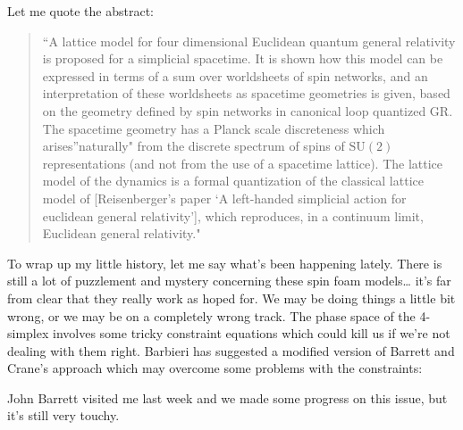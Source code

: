 \documentclass{article}
\def\tightlist{}
\renewcommand{\texttt}[1]{%
  \begingroup
  \ttfamily
  \begingroup\lccode`~=`/\lowercase{\endgroup\def~}{/\discretionary{}{}{}}%
  \begingroup\lccode`~=`[\lowercase{\endgroup\def~}{[\discretionary{}{}{}}%
  \begingroup\lccode`~=`.\lowercase{\endgroup\def~}{.\discretionary{}{}{}}%
  \catcode`/=\active\catcode`[=\active\catcode`.=\active
  \scantokens{#1\noexpand}%
  \endgroup
}
\begin{document}

Let me quote the abstract:

\begin{quote}
``A lattice model for four dimensional Euclidean quantum general
relativity is proposed for a simplicial spacetime. It is shown how this
model can be expressed in terms of a sum over worldsheets of spin
networks, and an interpretation of these worldsheets as spacetime
geometries is given, based on the geometry defined by spin networks in
canonical loop quantized GR. The spacetime geometry has a Planck scale
discreteness which arises''naturally" from the discrete spectrum of
spins of \(\mathrm{SU}(2)\) representations (and not from the use of a
spacetime lattice). The lattice model of the dynamics is a formal
quantization of the classical lattice model of {[}Reisenberger's paper
`A left-handed simplicial action for euclidean general relativity'{]},
which reproduces, in a continuum limit, Euclidean general relativity."
\end{quote}

To wrap up my little history, let me say what's been happening lately.
There is still a lot of puzzlement and mystery concerning these spin
foam models\ldots{} it's far from clear that they really work as hoped
for. We may be doing things a little bit wrong, or we may be on a
completely wrong track. The phase space of the 4-simplex involves some
tricky constraint equations which could kill us if we're not dealing
with them right. Barbieri has suggested a modified version of Barrett
and Crane's approach which may overcome some problems with the
constraints:


John Barrett visited me last week and we made some progress on this
issue, but it's still very touchy.
\end{document}
